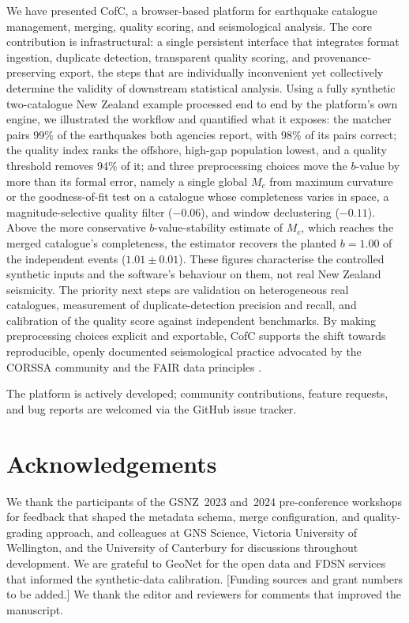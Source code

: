 \documentclass[12pt]{article}
\begin{document}
We have presented CofC, a browser-based platform for earthquake catalogue
management, merging, quality scoring, and seismological analysis.  The core
contribution is infrastructural: a single persistent interface that integrates
format ingestion, duplicate detection, transparent quality scoring, and
provenance-preserving export, the steps that are individually inconvenient
yet collectively determine the validity of downstream statistical analysis.
Using a fully synthetic two-catalogue New Zealand example processed end to end
by the platform's own engine, we illustrated the workflow and quantified what it
exposes: the matcher pairs 99\% of the earthquakes both agencies report, with
98\% of its pairs correct; the quality index ranks the offshore, high-gap
population lowest, and a quality threshold removes 94\% of it; and three
preprocessing choices move the $b$-value by more than its formal error, namely a
single global $M_c$ from maximum curvature or the goodness-of-fit test on a
catalogue whose completeness varies in space, a magnitude-selective quality
filter ($-0.06$), and window declustering ($-0.11$).  Above the more
conservative $b$-value-stability estimate of $M_c$, which reaches the merged
catalogue's completeness, the estimator recovers the planted $b = 1.00$ of the
independent events ($1.01 \pm 0.01$).
These figures characterise the controlled synthetic inputs and the software's
behaviour on them, not real New Zealand seismicity.
The priority next steps are validation on heterogeneous real catalogues,
measurement of duplicate-detection precision and recall, and calibration of the
quality score against independent benchmarks.  By making preprocessing choices explicit and exportable,
CofC supports the shift towards reproducible, openly documented seismological
practice advocated by the CORSSA community \citep{naylor2010} and the FAIR data
principles \citep{wilkinson2016}.

The platform is actively developed; community contributions, feature requests,
and bug reports are welcomed via the GitHub issue tracker.

\section*{Acknowledgements}

We thank the participants of the GSNZ~2023 and~2024 pre-conference workshops
\citep{gsnzworkshop2023,gsnzworkshop2024} for feedback that shaped the metadata
schema, merge configuration, and quality-grading approach, and colleagues at
GNS Science, Victoria University of Wellington, and the University of Canterbury
for discussions throughout development.  We are grateful to GeoNet for the
open data and FDSN services that informed the synthetic-data calibration.
[Funding sources and grant numbers to be added.]  We thank the editor and
reviewers for comments that improved the manuscript.
\end{document}
